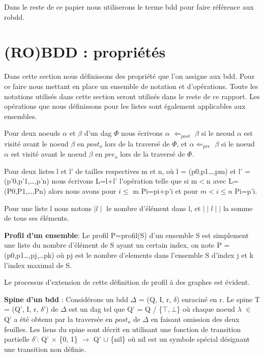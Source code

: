 \documentclass[french]{article}
\begin{document}
Dans le reste de ce papier nous utiliserons le terme bdd pour faire référence aux robdd.

\section{(RO)BDD : propriétés}
Dans cette section nous définissons des propriété que l'on assigne aux bdd. Pour ce faire nous mettant en place un ensemble de notation et d'opérations. Toute les notations utilisés dans cette section seront utilisés dans le reste de ce rapport. Les opérations que nous définissons pour les listes sont également applicables aux ensembles.
\vspace{5mm} %

Pour deux noeuds \(\alpha\) et \(\beta\) d'un dag \(\Phi\) nous écrivons \(\alpha\) \(\Leftarrow_{post}\) \(\beta\) si le neoud \(\alpha\) est visité avant le noeud \(\beta\) en \(post_{o}\) lors de la traversé de \(\Phi\), et \(\alpha\)\(\Leftarrow_{pre}\) \(\beta\) si le noeud \(\alpha\) est visité avant le noeud \(\beta\) en \(pre_{o}\) lors de la traversé de \(\Phi\).
\vspace{5mm} %

Pour deux listes l et l’ de tailles respectives m et n, où l = (p0,p1…,pm) et l’ = (p’0,p’1,…,p’n) nous écrivons L=l+l’ l'opération telle que si m\(<\)n avec L=(P0,P1,…,Pn) alors nous avons pour \(i\leq\) m Pi=pi+p’i et pour \(m<i\leq n\) Pi=p’i.

Pour une liste l nous notons \(\mid l\mid \) le nombre d'élément dans l, et \(\mid\mid l\mid\mid\) la somme de tous ses éléments.
\vspace{5mm} %

\textbf{Profil d'un ensemble}: Le profil P=profil(S) d'un ensemble S est simplement une liste du nombre d'élément de S ayant un certain index, on note P = (p0,p1…,pj,…pk) où pj est le nombre d'elements dans l'ensemble S d'index j et k l'index maximal de S. 

Le processus d'extension de cette définition de profil à des graphes est évident.
\vspace{5mm} %

\textbf{Spine d'un bdd} : Considérons un bdd \(\Delta\) = (Q, I, r, \(\delta\)) enraciné en r. Le spine T = (Q’, I, r, \(\delta\)’) de \(\Delta\) est un dag tel que Q’ = Q / \{\(\top,\bot\)\} où chaque noeud \(\lambda\) \(\in\) Q’ a été obtenu par la traversée en \(post_{o}\) de \(\Delta\) en faisant omission des deux feuilles. Les liens du spine sont décrit en utilisant une fonction de transition partielle \(\delta\)’: Q’ \(\times\) \{0, 1\} \(\rightarrow\) Q' \(\cup\) \{nil\} où nil est un symbole spécial désignant une transition non définie.
\end{document}
